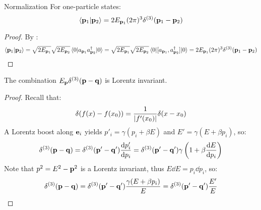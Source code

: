 \begin{proposition}{Normalization}{}
  For one-particle states:
  \begin{equation}
    \braket{\mathbf{p}_1 | \mathbf{p}_2} = 2E_{\mathbf{p}_1} (2\pi)^3 \delta^{(3)}(\mathbf{p}_1 - \mathbf{p}_2)
  \end{equation}
\end{proposition}

\begin{proofbox}
  \begin{proof}
    By :
    \begin{equation*}
      \braket{\mathbf{p}_1 | \mathbf{p}_2} = \sqrt{2E_{\mathbf{p}_1}} \sqrt{2E_{\mathbf{p}_2}} \braket{0 | a_{\mathbf{p}_1} a_{\mathbf{p}_2}^\dagger | 0}
      = \sqrt{2E_{\mathbf{p}_1}} \sqrt{2E_{\mathbf{p}_2}} \braket{0 | [a_{\mathbf{p}_1} , a_{\mathbf{p}_2}^\dagger] | 0} = 2E_{\mathbf{p}_1} (2\pi)^3 \delta^{(3)}(\mathbf{p}_1 - \mathbf{p}_2)
    \end{equation*}
  \end{proof}
\end{proofbox}

\begin{lemma}{}{}
  The combination $ E_{\mathbf{p}} \delta^{(3)}(\mathbf{p} - \mathbf{q}) $ is Lorentz invariant.
\end{lemma}

\begin{proofbox}
  \begin{proof}
    Recall that:
    \begin{equation}
      \delta(f(x) - f(x_0)) = \frac{1}{\left\lvert f'(x_0)\right\rvert} \delta(x - x_0)
    \end{equation}
    A Lorentz boost along $ \mathbf{e}_i $ yields $ p'_i = \gamma (p_i + \beta E) $ and $ E' = \gamma (E + \beta p_i) $, so:
    \begin{equation*}
        \delta^{(3)}(\mathbf{p} - \mathbf{q})
        = \delta^{(3)}(\mathbf{p}' - \mathbf{q}') \frac{\mathrm{d} p'_i}{\mathrm{d} p_i}
        = \delta^{(3)}(\mathbf{p}' - \mathbf{q}') \gamma \left( 1 + \beta \frac{\mathrm{d} E}{\mathrm{d} p_i} \right)
    \end{equation*}
    Note that $ p^2 = E^2 - \mathbf{p}^2 $ is a Lorentz invariant, thus $ E \dd E = p_i \dd p_i $, so:
    \begin{equation*}
      \delta^{(3)}(\mathbf{p} - \mathbf{q})
      = \delta^{(3)}(\mathbf{p}' - \mathbf{q}') \frac{\gamma (E + \beta p_i)}{E}
      = \delta^{(3)}(\mathbf{p}' - \mathbf{q}') \frac{E'}{E}
    \end{equation*}
  \end{proof}
\end{proofbox}

